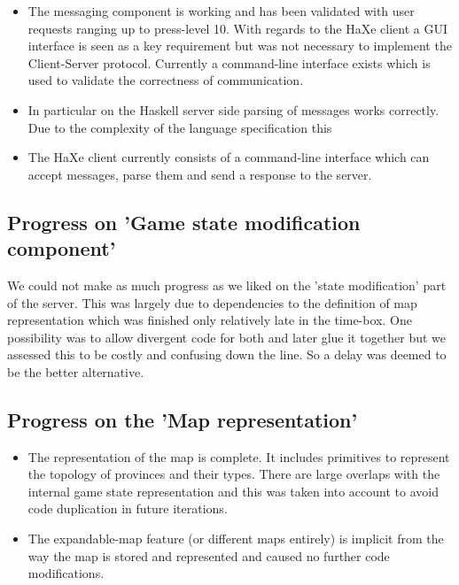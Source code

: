 \documentclass[12pt]{article}
\begin{document}
\begin{itemize}
\begin{itemize}
\item The messaging component is working and has been validated with user requests
ranging up to press-level 10. With regards to the HaXe client a GUI interface is
seen as a key requirement but was not necessary to implement the Client-Server
protocol. Currently a command-line interface exists which is used to validate
the correctness of communication.
 
\item In particular on the Haskell server side parsing of messages works correctly.
Due to the complexity of the language specification this

\item The HaXe client currently consists of a command-line interface which can accept
messages, parse them and send a response to the server. 

\end{itemize}

\subsection{Progress on 'Game state modification component'}

We could not make as much progress as we liked on the 'state modification' part of
the server. This was largely due to dependencies to the definition of map representation
which was finished only relatively late in the time-box. One possibility was to allow
divergent code for both and later glue it together but we assessed this to be costly and
confusing down the line. So a delay was deemed to be the better alternative.

\subsection{Progress on the 'Map representation'}

\begin{itemize}

\item The representation of the map is complete. It includes primitives to represent 
the topology of provinces and their types. There are large overlaps with the internal
game state representation and this was taken into account to avoid code duplication
in future iterations.

\item The expandable-map feature (or different maps entirely) is implicit
from the way the map is stored and represented and caused no further code
modifications. 


\end{itemize}
\end{itemize}
\end{document}
